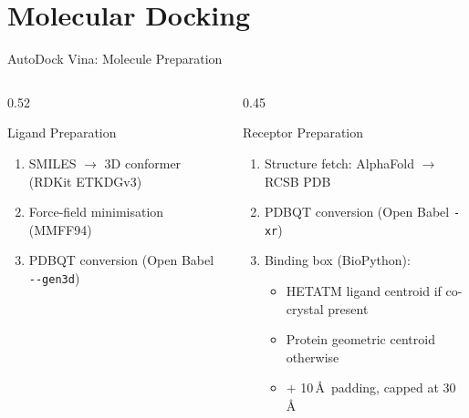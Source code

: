 \section{Molecular Docking}

\begin{frame}{AutoDock Vina: Molecule Preparation}
  \begin{columns}[T]
    \begin{column}{0.52\textwidth}
      \begin{block}{Ligand Preparation}
        \begin{enumerate}
          \item SMILES $\rightarrow$ 3D conformer (RDKit ETKDGv3)
          \item Force-field minimisation (MMFF94)
          \item PDBQT conversion (Open Babel \texttt{-{}-gen3d})
        \end{enumerate}
      \end{block}
    \end{column}
    \begin{column}{0.45\textwidth}
      \begin{block}{Receptor Preparation}
        \begin{enumerate}
          \item Structure fetch: AlphaFold $\rightarrow$ RCSB PDB
          \item PDBQT conversion (Open Babel \texttt{-xr})
          \item Binding box (BioPython):
                \begin{itemize}
                  \item HETATM ligand centroid if co-crystal present
                  \item Protein geometric centroid otherwise
                  \item $+$ 10\,\AA\ padding, capped at 30\,\AA
                \end{itemize}
        \end{enumerate}
      \end{block}
    \end{column}
  \end{columns}
\end{frame}


